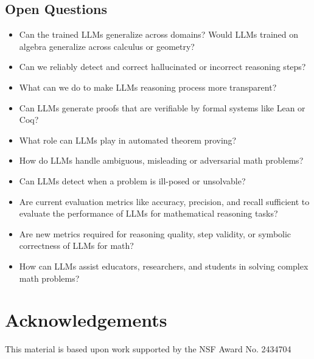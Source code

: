 \documentclass[acmsmall,anonymous]{acmart}
\begin{document}
\subsection{Open Questions}
\begin{itemize}
    \item Can the trained LLMs generalize across domains? Would LLMs trained on algebra generalize across calculus or geometry?
    \item Can we reliably detect and correct hallucinated or incorrect reasoning steps? 
    \item What can we do to make LLMs reasoning process more transparent? 
    \item Can LLMs generate proofs that are verifiable by formal systems like Lean or Coq? 
    \item What role can LLMs play in automated theorem proving? 
    \item How do LLMs handle ambiguous, misleading or adversarial math problems? 
    \item Can LLMs detect when a problem is ill-posed or unsolvable? 
    \item Are current evaluation metrics like accuracy, precision, and recall sufficient to evaluate the performance of LLMs for mathematical reasoning tasks?
    \item Are new metrics required for reasoning quality, step validity, or symbolic correctness of LLMs for math? 
    \item How can LLMs assist educators, researchers, and students in solving complex math problems? 
\end{itemize}

\section*{Acknowledgements}This material is based upon work supported by the NSF Award No. 2434704



\end{document}
